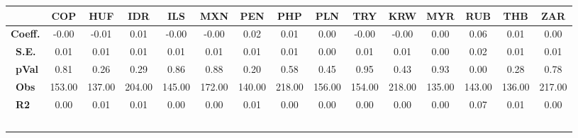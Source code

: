 \begin{tabular}{l|cccccccccccccc}
\hline
&\textbf{COP}&\textbf{HUF}&\textbf{IDR}&\textbf{ILS}&\textbf{MXN}&\textbf{PEN}&\textbf{PHP}&\textbf{PLN}&\textbf{TRY}&\textbf{KRW}&\textbf{MYR}&\textbf{RUB}&\textbf{THB}&\textbf{ZAR}\\\hline
\textbf{Coeff.}&-0.00&-0.01&0.01&-0.00&-0.00&0.02&0.01&0.00&-0.00&-0.00&0.00&0.06&0.01&0.00\\\
\textbf{S.E.}&0.01&0.01&0.01&0.01&0.01&0.01&0.01&0.00&0.01&0.01&0.00&0.02&0.01&0.01\\\
\textbf{pVal}&0.81&0.26&0.29&0.86&0.88&0.20&0.58&0.45&0.95&0.43&0.93&0.00&0.28&0.78\\\
\textbf{Obs}&153.00&137.00&204.00&145.00&172.00&140.00&218.00&156.00&154.00&218.00&135.00&143.00&136.00&217.00\\\
\textbf{R2}&0.00&0.01&0.01&0.00&0.00&0.01&0.00&0.00&0.00&0.00&0.00&0.07&0.01&0.00\\\
\end{tabular}
